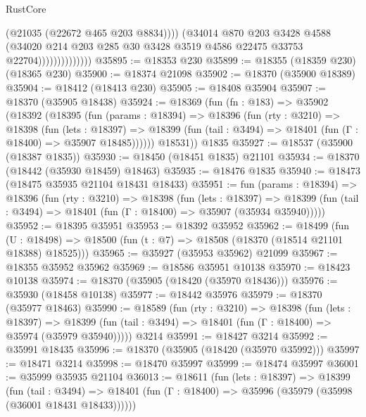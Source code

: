 \begin{lexlean}{RustCore}
\begin{coremodule}
                                (@21035 (@22672 @465 @203 @8834))))
                            (@34014
                              @870
                              @203
                              @3428
                              @4588
                              (@34020
                                @214
                                @203
                                @285
                                @30
                                @3428
                                @3519
                                @4586
                                @22475
                                @33753
                                @22704))))))))))))))
@35895 := @18353 @230
@35899 := @18355 (@18359 @230) (@18365 @230)
@35900 := @18374 @21098
@35902 := @18370 (@35900 @18389)
@35904 := @18412 (@18413 @230)
@35905 := @18408 @35904
@35907 := @18370 (@35905 @18438)
@35924 := @18369
    (fun (fn : @183) =>
    @35902
      (@18392
        (@18395
          (fun (params : @18394) =>
          @18396
            (fun (rty : @3210) =>
            @18398
              (fun (lets : @18397) =>
              @18399 (fun (tail : @3494) => @18401 (fun (Γ : @18400) => @35907 @18485))))))
        @18531))
    @1835
@35927 := @18537 (@35900 (@18387 @1835))
@35930 := @18450 (@18451 @1835) @21101
@35934 := @18370 (@18442 (@35930 @18459) @18463)
@35935 := @18476 @1835
@35940 := @18473 (@18475 @35935 @21104 @18431 @18433)
@35951 := fun (params : @18394) =>
  @18396
    (fun (rty : @3210) =>
    @18398
      (fun (lets : @18397) =>
      @18399 (fun (tail : @3494) => @18401 (fun (Γ : @18400) => @35907 (@35934 @35940)))))
@35952 := @18395 @35951
@35953 := @18392 @35952
@35962 := @18499
    (fun (U : @18498) => @18500 (fun (t : @7) => @18508 (@18370 (@18514 @21101 @18388) @18525)))
@35965 := @35927 (@35953 @35962) @21099
@35967 := @18355 @35952 @35962
@35969 := @18586 @35951 @10138
@35970 := @18423 @10138
@35974 := @18370 (@35905 (@18420 (@35970 @18436)))
@35976 := @35930 (@18458 @10138)
@35977 := @18442 @35976
@35979 := @18370 (@35977 @18463)
@35990 := @18589
    (fun (rty : @3210) =>
    @18398
      (fun (lets : @18397) =>
      @18399 (fun (tail : @3494) => @18401 (fun (Γ : @18400) => @35974 (@35979 @35940)))))
    @3214
@35991 := @18427 @3214
@35992 := @35991 @18435
@35996 := @18370 (@35905 (@18420 (@35970 @35992)))
@35997 := @18471 @3214
@35998 := @18470 @35997
@35999 := @18474 @35997
@36001 := @35999 @35935 @21104
@36013 := @18611
    (fun (lets : @18397) =>
    @18399
      (fun (tail : @3494) =>
      @18401 (fun (Γ : @18400) => @35996 (@35979 (@35998 (@36001 @18431 @18433))))))

\end{coremodule}
\end{lexlean}

